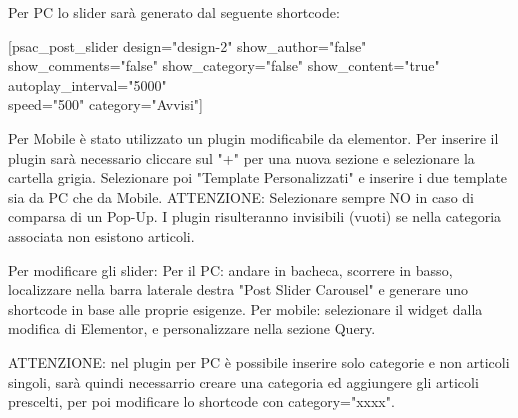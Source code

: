 \documentclass{article}
\begin{document}
	Per PC lo slider sarà generato dal seguente shortcode: 
	

[psac\_post\_slider design="design-2" show\_author="false" show\_comments="false" show\_category="false" show\_content="true" autoplay\_interval="5000"\\ speed="500" category="Avvisi"]

	Per Mobile è stato utilizzato un plugin modificabile da elementor. Per inserire il plugin sarà necessario cliccare sul "+" per una nuova sezione e selezionare la cartella grigia. Selezionare poi "Template Personalizzati" e inserire i due template sia da PC che da Mobile.
	ATTENZIONE: Selezionare sempre NO in caso di comparsa di un Pop-Up. I plugin risulteranno invisibili (vuoti) se nella categoria associata non esistono articoli.
	
	Per modificare gli slider:
	Per il PC: andare in bacheca, scorrere in basso, localizzare nella barra laterale destra "Post Slider Carousel" e generare uno shortcode in base alle proprie esigenze.
	Per mobile: selezionare il widget dalla modifica di Elementor, e personalizzare nella sezione Query.

	ATTENZIONE: nel plugin per PC è possibile inserire solo categorie e non articoli singoli, sarà quindi necessarrio creare una categoria ed aggiungere gli articoli prescelti, per poi modificare lo shortcode con category="xxxx".
\end{document}
